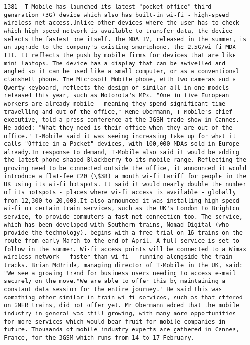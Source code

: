 \documentclass[11pt]{article}
\begin{document}
\begin{Verbatim}[commandchars=\\\{\}]
         1381  T-Mobile has launched its latest "pocket office" third-generation (3G) device which also has built-in wi-fi - high-speed wireless net access.Unlike other devices where the user has to check which high-speed network is available to transfer data, the device selects the fastest one itself. The MDA IV, released in the summer, is an upgrade to the company's existing smartphone, the 2.5G/wi-fi MDA III. It reflects the push by mobile firms for devices that are like mini laptops. The device has a display that can be swivelled and angled so it can be used like a small computer, or as a conventional clamshell phone. The Microsoft Mobile phone, with two cameras and a Qwerty keyboard, reflects the design of similar all-in-one models released this year, such as Motorola's MPx. "One in five European workers are already mobile - meaning they spend significant time travelling and out of the office," Rene Obermann, T-Mobile's chief executive, told a press conference at the 3GSM trade show in Cannes. He added: "What they need is their office when they are out of the office." T-Mobile said it was seeing increasing take up for what it calls "Office in a Pocket" devices, with 100,000 MDAs sold in Europe already.In response to demand, T-Mobile also said it would be adding the latest phone-shaped Blackberry to its mobile range. Reflecting the growing need to be connected outside the office, it announced it would introduce a flat-fee £20 (\$38) a month wi-fi tariff for people in the UK using its wi-fi hotspots. It said it would nearly double the number of its hotspots - places where wi-fi access is available - globally from 12,300 to 20,000.It also announced it was installing high-speed wi-fi on certain train services, such as the UK's London to Brighton service, to provide commuters a fast net connection too. The service, which has been developed with Southern trains, Nomad Digital (who provide the technology), begins with a free trial on 16 trains on the route from early March to the end of April. A full service is set to follow in the summer. Wi-fi access points will be connected to a Wimax wireless network - faster than wi-fi - running alongside the train tracks. Brian McBride, managing director of T-Mobile in the UK, said: "We see a growing trend for business users needing to access e-mail securely on the move."We are able to offer this by maintaining a constant data session for the entire journey." He said this was something other similar in-train wi-fi services, such as that offered on GNER trains, did not offer yet. Mr Obermann added that the mobile industry in general was still growing, with many more opportunities for more services which would bear fruit for mobile companies in future. Thousands of mobile industry experts are gathered in Cannes, France, for the 3GSM which runs from 14 to 17 February.                                                                                                                                                                                                                                                                                                                                                                                                                                                             
\end{Verbatim}
\end{document}
